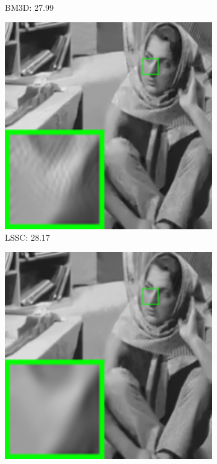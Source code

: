 \begin{figure}
\begin{adjustwidth}{-2cm}{}
\begin{subfigure}[t]{0.19\textwidth}
		\caption{BM3D: 27.99}
    \end{subfigure}
    \hfill
    \begin{subfigure}[t]{0.19\textwidth}
        \centering
        \includegraphics[width=1\textwidth]{images/twsc/awgn/resize_br_LSSC_40_barbara.png}
		\caption{LSSC: 28.17}
    \end{subfigure}
    \hfill
    \begin{subfigure}[t]{0.19\textwidth}
        \centering
        \includegraphics[width=1\textwidth]{images/twsc/awgn/resize_br_NCSR_40_barbara.png}

\end{subfigure}
\end{adjustwidth}
\end{figure}
